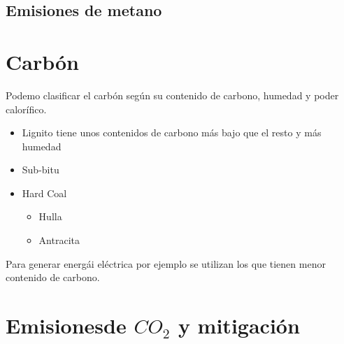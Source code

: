 \subsection{Emisiones de metano}

\section{Carbón}

Podemo clasificar el carbón según su contenido de carbono, humedad y poder calorífico.

\begin{itemize}
    \item Lignito tiene unos contenidos de carbono más bajo que el resto y más humedad
    \item Sub-bitu
    \item Hard Coal 
    \begin{itemize}
        \item Hulla
        \item Antracita
    \end{itemize}
\end{itemize}

Para generar energái eléctrica por ejemplo se utilizan los que tienen menor contenido de carbono. 

\section{Emisionesde $CO_2$ y mitigación }